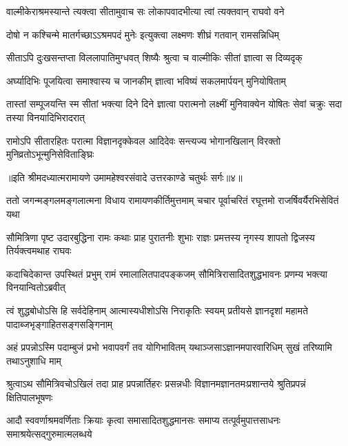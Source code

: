 \twolineshloka
{वाल्मीकेराश्रमस्यान्ते त्यक्त्वा सीतामुवाच सः}
{लोकापवादभीत्या त्वां त्यक्तवान् राघवो वने} %

\twolineshloka
{दोषो न कश्चिन्मे मातर्गच्छाऽऽश्रमपदं मुनेः}
{इत्युक्त्वा लक्ष्मणः शीघ्रं गतवान् रामसन्निधिम्} %

\twolineshloka
{सीताऽपि दुःखसन्तप्ता विललापातिमुग्धवत्}
{शिष्यैः श्रुत्वा च वाल्मीकिः सीतां ज्ञात्वा स दिव्यदृक्} %

\twolineshloka
{अर्घ्यादिभिः पूजयित्वा समाश्वास्य च जानकीम्}
{ज्ञात्वा भविष्यं सकलमार्पयन् मुनियोषिताम्} %

\threelineshloka
{तास्तां सम्पूजयन्ति स्म सीतां भक्त्या दिने दिने}
{ज्ञात्वा परात्मनो लक्ष्मीं मुनिवाक्येन योषितः}
{सेवां चक्रुः सदा तस्या विनयादिभिरादरात्} %

\twolineshloka
{रामोऽपि सीतारहितः परात्मा विज्ञानदृक्केवल आदिदेवः}
{सन्त्यज्य भोगानखिलान् विरक्तो मुनिव्रतोऽभून्मुनिसेविताङ्घ्रिः} %

{॥इति श्रीमदध्यात्मरामायणे उमामहेश्वरसंवादे उत्तरकाण्डे
चतुर्थः सर्गः॥४॥
}





\fourlineindentedshloka
{ततो जगन्मङ्गलमङ्गलात्मना}
{विधाय रामायणकीर्तिमुत्तमाम्}
{चचार पूर्वाचरितं रघूत्तमो}
{राजर्षिवर्यैरभिसेवितं यथा} %

\fourlineindentedshloka
{सौमित्रिणा पृष्ट उदारबुद्धिना}
{रामः कथाः प्राह पुरातनीः शुभाः}
{राज्ञः प्रमत्तस्य नृगस्य शापतो}
{द्विजस्य तिर्यक्त्वमथाह राघवः} %

\fourlineindentedshloka
{कदाचिदेकान्त उपस्थितं प्रभुम्}
{रामं रमालालितपादपङ्कजम्}
{सौमित्रिरासादितशुद्धभावनः}
{प्रणम्य भक्त्या विनयान्वितोऽब्रवीत्} %

\fourlineindentedshloka
{त्वं शुद्धबोधोऽसि हि सर्वदेहिनाम्}
{आत्मास्यधीशोऽसि निराकृतिः स्वयम्}
{प्रतीयसे ज्ञानदृशां महामते}
{पादाब्जभृङ्गाहितसङ्गसङ्गिनाम्} %

\fourlineindentedshloka
{अहं प्रपन्नोऽस्मि पदाम्बुजं प्रभो}
{भवापवर्गं तव योगिभावितम्}
{यथाञ्जसाऽज्ञानमपारवारिधिम्}
{सुखं तरिष्यामि तथाऽनुशाधि माम्} %

\fourlineindentedshloka
{श्रुत्वाऽथ सौमित्रिवचोऽखिलं तदा}
{प्राह प्रपन्नार्तिहरः प्रसन्नधीः}
{विज्ञानमज्ञानतमःप्रशान्तये}
{श्रुतिप्रपन्नं क्षितिपालभूषणः} %

\fourlineindentedshloka
{आदौ स्ववर्णाश्रमवर्णिताः क्रियाः}
{कृत्वा समासादितशुद्धमानसः}
{समाप्य तत्पूर्वमुपात्तसाधनः}
{समाश्रयेत्सद्गुरुमात्मलब्धये} %

